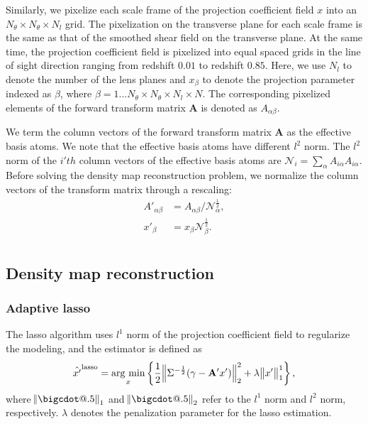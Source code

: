\documentclass[twocolumn]{aastex62}
\makeatletter
\newcommand*\bigcdot{\mathpalette\bigcdot@{.5}}
\newcommand*\bigcdot@[2]{\mathbin{\vcenter{\hbox{\scalebox{#2}{$\m@th#1\bullet$}}}}}
\newcommand{\argmin}{\mathop{\rm arg~min}\limits}
\makeatother
\begin{document}
Similarly, we pixelize each scale frame of the projection coefficient field $x$
into an $N_\theta \times N_\theta \times N_l$ grid. The pixelization on the
transverse plane for each scale frame is the same as that of the
smoothed shear field on the transverse plane. At the same time, the projection
coefficient field is pixelized into equal spaced grids in the line of sight
direction ranging from redshift $0.01$ to redshift $0.85$. Here, we use $N_l$
to denote the number of the lens planes and $x_{\beta}$ to denote the
projection parameter indexed as $\beta$, where $\beta=1...N_\theta \times
N_\theta \times N_l \times N$. The corresponding pixelized elements of the
forward transform matrix $\mathbf{A}$ is denoted as $A_{\alpha\beta}$.

We term the column vectors of the forward transform matrix $\mathbf{A}$ as the
effective basis atoms. We note that the effective basis atoms have different
$l^2$ norm. The $l^2$ norm of the $i'th$ column vectors of the effective basis
atoms are $\mathcal{N}_{i}=\sum_\alpha A_{i\alpha}A_{i\alpha}$. Before solving
the density map reconstruction problem, we normalize the column vectors of the
transform matrix through a rescaling:
\begin{equation}
\begin{split}
A'_{\alpha\beta}&=A_{\alpha\beta}/\mathcal{N}_{\alpha}^{\frac{1}{2}},\\
x'_{\beta}&=x_{\beta}\mathcal{N}_{\beta}^{\frac{1}{2}}.\\
\end{split}
\end{equation}

\subsection{Density map reconstruction}
\label{subsec_method_reconstruction}

\subsubsection{Adaptive lasso}

The lasso algorithm uses $l^1$ norm of the projection coefficient field to
regularize the modeling, and the estimator is defined as
\begin{equation}
\hat{x'}^{\rm{lasso}}=\argmin_{x} \left\{
\frac{1}{2}\norm{\Sigma^{-\frac{1}{2}}(\gamma- \mathbf{A'} x')}_2^2+
\lambda \norm{x'}^1_1\right\},
\end{equation}
where $\norm{\bigcdot}_1$ and $\norm{\bigcdot}_2$ refer to the $l^1$ norm and
$l^2$ norm, respectively.  $\lambda$ denotes the penalization parameter
for the lasso estimation.
\end{document}

